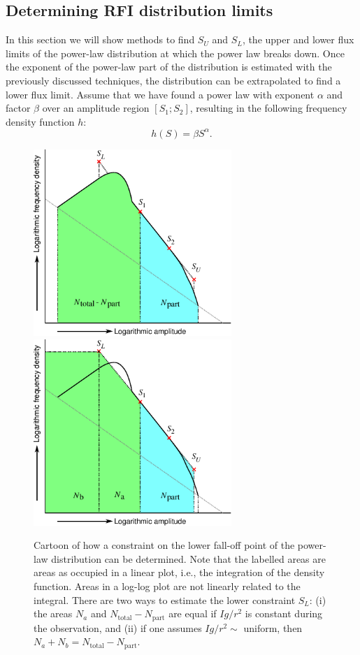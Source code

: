 \documentclass[useAMS,usenatbib]{mn2e}
\begin{document}
\subsection{Determining RFI distribution limits} \label{sec:rfi-distribution-constraints}
In this section we will show methods to find $S_U$ and $S_L$, the upper and lower flux limits of the power-law distribution at which the power law breaks down. Once the exponent of the power-law part of the distribution is estimated with the previously discussed techniques, the distribution can be extrapolated to find a lower flux limit. Assume that we have found a power law with exponent $\alpha$ and factor $\beta$ over an amplitude region $[S_1 ; S_2]$, resulting in the following frequency density function $h$:
\begin{equation} \label{eq:amplitude-power-law}
h(S) = \beta S^\alpha.
\end{equation}
\begin{figure}
\begin{center}
\includegraphics[width=7.5cm]{img/explanation-lower-constraint/FindingCounts}
\includegraphics[width=7.5cm]{img/explanation-lower-constraint/FindingConstraints}
\caption{Cartoon of how a constraint on the lower fall-off point of the power-law distribution can be determined. Note that the labelled areas are areas as occupied in a linear plot, i.e., the integration of the density function. Areas in a log-log plot are not linearly related to the integral. There are two ways to estimate the lower constraint $S_L$: (i) the areas $N_a$ and $N_\textrm{total}-N_\textrm{part}$ are equal if $Ig/r^2$ is constant during the observation, and (ii) if one assumes $Ig/r^2\sim$ uniform, then $N_a+N_b = N_\textrm{total}-N_\textrm{part}$.}
\label{fig:explanation-constraints}
\end{center}
\end{figure}
\end{document}
